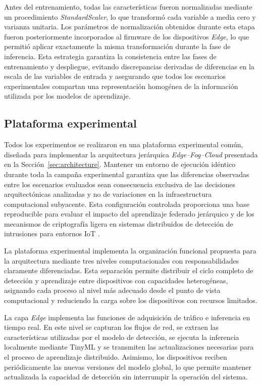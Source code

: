 \documentclass[journal,article,submit,moreauthors]{Definitions/mdpi}
\begin{document}
Antes del entrenamiento, todas las características fueron normalizadas mediante un procedimiento \textit{StandardScaler}, lo que transformó cada variable a media cero y varianza unitaria. Los parámetros de normalización obtenidos durante esta etapa fueron posteriormente incorporados al firmware de los dispositivos \textit{Edge}, lo que permitió aplicar exactamente la misma transformación durante la fase de inferencia. Esta estrategia garantiza la consistencia entre las fases de entrenamiento y despliegue, evitando discrepancias derivadas de diferencias en la escala de las variables de entrada y asegurando que todos los escenarios experimentales compartan una representación homogénea de la información utilizada por los modelos de aprendizaje.

\subsection{Plataforma experimental}
Todos los experimentos se realizaron en una plataforma experimental común, diseñada para implementar la arquitectura jerárquica \textit{Edge--Fog--Cloud} presentada en la Sección~\ref{sec:architecture}. Mantener un entorno de ejecución idéntico durante toda la campaña experimental garantiza que las diferencias observadas entre los escenarios evaluados sean consecuencia exclusiva de las decisiones arquitectónicas analizadas y no de variaciones en la infraestructura computacional subyacente. Esta configuración controlada proporciona una base reproducible para evaluar el impacto del aprendizaje federado jerárquico y de los mecanismos de criptografía ligera en sistemas distribuidos de detección de intrusiones para entornos IoT \cite{Wang2019,SaravanaBalaji2023}.

La plataforma experimental implementa la organización funcional propuesta para la arquitectura mediante tres niveles computacionales con responsabilidades claramente diferenciadas. Esta separación permite distribuir el ciclo completo de detección y aprendizaje entre dispositivos con capacidades heterogéneas, asignando cada proceso al nivel más adecuado desde el punto de vista computacional y reduciendo la carga sobre los dispositivos con recursos limitados.

La capa \textit{Edge} implementa las funciones de adquisición de tráfico e inferencia en tiempo real. En este nivel se capturan los flujos de red, se extraen las características utilizadas por el modelo de detección, se ejecuta la inferencia localmente mediante TinyML y se transmiten las actualizaciones necesarias para el proceso de aprendizaje distribuido. Asimismo, los dispositivos reciben periódicamente las nuevas versiones del modelo global, lo que permite mantener actualizada la capacidad de detección sin interrumpir la operación del sistema.
\end{document}
